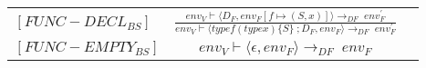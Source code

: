 \begin{semantik}
    \bgroup
    \def\arraystretch{3}
    \begin{table}[H]
    \centering
    \begin{tabular}{l c l}
        
        $[FUNC-DECL_{BS}]$ & $
        \frac{env_V \vdash \langle D_F, env_F[f \mapsto (S, x)] \rangle \rightarrow_{DF}\; env_F^\prime}
        {env_V \vdash \langle type f(type x) \{ S \}\; ; D_F, env_F \rangle \rightarrow_{DF}\; env_F^\prime}
        $ & \\
        
        $[FUNC-EMPTY_{BS}]$ & $
        env_V \vdash \langle \epsilon, env_F \rangle \rightarrow_{DF}\; env_F
        $
        
    \end{tabular}
    \label{tab:funktioner}
    \end{table}
    \egroup
    \caption{Deklaration af funktioner}
\end{semantik}



\subsubsection*{}

\subsubsection*{}

\subsubsection*{}